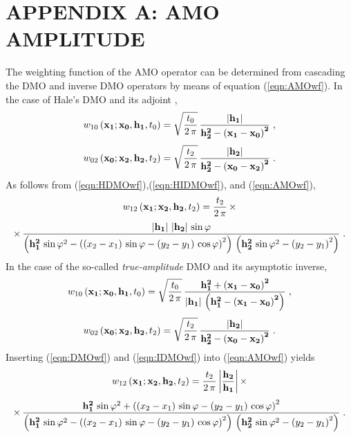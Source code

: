 \section{APPENDIX A: AMO AMPLITUDE}
The weighting function of the AMO operator can be determined from 
cascading the DMO and inverse DMO operators by means of equation
(\ref{eqn:AMOwf}). In the case of Hale's DMO \cite{Hale} and
its adjoint \cite{GEO52-07-09730984},
\begin{equation}
w_{10}\left({\bf x_1;x_0, h_1},t_0\right) = 
\sqrt{t_0 \over 2\,\pi}\,
{{\bf {\left|h_1\right|} \over {h_2^2-\left(x_1-x_0\right)^2}}}\;,
\label{eqn:HDMOwf}
\end{equation}
\begin{equation}
w_{02}\left({\bf x_0;x_2, h_2},t_2\right)  = 
\sqrt{t_2 \over 2\,\pi}\,
{{\bf {\left|h_2\right|} \over {h_2^2-\left(x_0-x_2\right)^2}}}\;.
\label{eqn:HIDMOwf}
\end{equation}  
As follows from (\ref{eqn:HDMOwf}),(\ref{eqn:HIDMOwf}), and (\ref{eqn:AMOwf}),
\begin{eqnarray*}
w_{12}\left({\bf x_1;x_2, h_2},t_2\right) = {t_2 \over {2\,\pi}}\,
\times
\end{eqnarray*}
\begin{eqnarray}
\times\,
{{{\bf \left|h_1\right|\,\left|h_2\right|}\,\sin{\varphi}}\over
{\left({\bf h_1^2}\,\sin{\varphi}^2-
\left(\left(x_2-x_1\right)\,\sin{\varphi}-
\left(y_2-y_1\right)\,\cos{\varphi}\right)^2\right)\,
\left({\bf h_2^2}\,\sin{\varphi}^2-\left(y_2-y_1\right)^2\right)}}\;.
\label{eqn:HAMOwfdf}
\end{eqnarray}
In the case of the so-called {\em true-amplitude} DMO
\cite{black} and its asymptotic inverse,
\begin{equation}
w_{10}\left({\bf x_1;x_0, h_1},t_0\right)  = 
\sqrt{t_0 \over 2\,\pi}\,
{\bf {h_1^2+\left(x_1-x_0\right)^2} \over
\left|h_1\right|\,\left(h_1^2-\left(x_1-x_0\right)^2\right)}\;,
\label{eqn:DMOwf}
\end{equation}
\begin{equation}
w_{02}\left({\bf x_0;x_2, h_2},t_2\right)  = 
\sqrt{t_2 \over 2\,\pi}\,
{{\bf {\left|h_2\right|} \over {h_2^2-\left(x_0-x_2\right)^2}}}\;.
\label{eqn:IDMOwf}
\end{equation}  
Inserting (\ref{eqn:DMOwf}) and (\ref{eqn:IDMOwf}) into (\ref{eqn:AMOwf}) yields
\begin{eqnarray*}
w_{12}\left({\bf x_1;x_2, h_2},t_2\right) = {t_2 \over {2\,\pi}}\,
{\left|{\bf h_2 \over h_1}\right|}\,\times
\end{eqnarray*}
\begin{eqnarray}
\times\,
{{{\bf h_1^2}\,\sin{\varphi}^2+
\left(\left(x_2-x_1\right)\,\sin{\varphi}-
\left(y_2-y_1\right)\,\cos{\varphi}\right)^2}\over
{\left({\bf h_1^2}\,\sin{\varphi}^2-
\left(\left(x_2-x_1\right)\,\sin{\varphi}-
\left(y_2-y_1\right)\,\cos{\varphi}\right)^2\right)\,
\left({\bf h_2^2}\,\sin{\varphi}^2-\left(y_2-y_1\right)^2\right)}}\;.
\label{eqn:AMOwfdf}
\end{eqnarray}
\appendix

